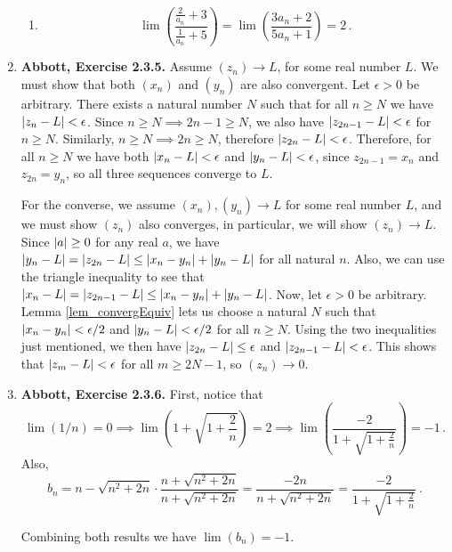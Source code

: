 \documentclass{article}
\DeclarePairedDelimiter\abs{\lvert}{\rvert}
\newcommand{\exc}[2][Abbott]{\item \textbf{#1, Exercise #2.}}
\begin{document}
\begin{enumerate}
\begin{enumerate}
		\item \begin{equation*}
		      \lim(\frac{\frac{2}{a_n}+3}{\frac{1}{a_n}+5}) = \lim (\frac{3a_n + 2}{5a_n + 1}) = 2 \, .
		\end{equation*}
	\end{enumerate}
				      
	\exc{2.3.5}
	Assume $(z_n) \rightarrow L$, for some real number $L$. We must show that both $(x_n)$ and $(y_n)$ are also convergent. Let $\epsilon > 0$ be arbitrary. There exists a natural number $N$ such that for all $n \geq N$ we have $\abs*{z_n - L} < \epsilon$. Since $n \geq N \implies 2n-1 \geq N$, we also have $\abs*{z_{2n-1} - L} < \epsilon$ for $n \geq N$. Similarly, $n \geq N \implies 2n \geq N$, therefore $\abs*{z_{2n}-L} < \epsilon$. Therefore, for all $n \geq N$ we have both $\abs*{x_n - L} < \epsilon$ and $\abs*{y_n - L} < \epsilon$, since $z_{2n-1} = x_n$ and $z_{2n} = y_n$, so all three sequences converge to $L$.
			        
	For the converse, we assume $(x_n), (y_n) \rightarrow L$ for some real number $L$, and we must show $(z_n)$ also converges, in particular, we will show $(z_n) \rightarrow L$. Since $\abs*{a} \geq 0$ for any real $a$, we have $\abs*{y_n-L} = \abs*{z_{2n} - L} \leq \abs*{x_n-y_n} + \abs*{y_n-L}$ for all natural $n$. Also, we can use the triangle inequality to see that $\abs*{x_n-L} = \abs*{z_{2n-1}- L} \leq \abs*{x_n-y_n} + \abs*{y_n - L}$. Now, let $\epsilon > 0$ be arbitrary. Lemma \ref{lem_convergEquiv} lets us choose a natural $N$ such that $\abs*{x_n-y_n} < \epsilon/2$ and $\abs*{y_n-L} < \epsilon/2$ for all $n \geq N$. Using the two inequalities just mentioned, we then have $\abs*{z_{2n} - L} \leq \epsilon$ and $\abs*{z_{2n-1} - L} < \epsilon$. This shows that $\abs*{z_m - L} < \epsilon$ for all $m \geq 2N-1$, so $(z_n) \rightarrow 0$.
			        
			        
	\exc{2.3.6}
	First, notice that
	\begin{equation*}
		\lim (1/n) = 0 \implies \lim(1+\sqrt{1+\frac{2}{n}}) = 2 \implies \lim (\frac{-2}{1+\sqrt{1+ \frac{2}{n}}}) = -1 \, .
	\end{equation*}
	Also, 
	\begin{equation*}
		b_n = n-\sqrt{n^2+2n} \cdot \frac{n+\sqrt{n^2+2n}}{n+\sqrt{n^2+2n}} = \frac{-2n}{n+\sqrt{n^2+2n}} = \frac{-2}{1+\sqrt{1+\frac{2}{n}}} ~ .
	\end{equation*}
			        
	Combining both results we have $\lim(b_n) = -1$.
			        

\end{enumerate}
\end{document}
